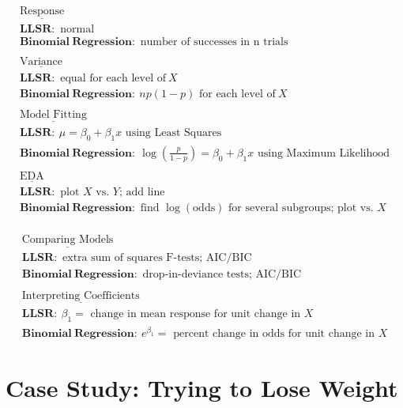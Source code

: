 \documentclass[
]{krantz}
\begin{document}
\begin{gather*}
\underline{\textrm{Response}} \\
\mathbf{LLSR:}\textrm{ normal} \\
\mathbf{Binomial\ Regression:}\textrm{ number of successes in n trials} \\
\textrm{ } \\
\underline{\textrm{Variance}} \\
\mathbf{LLSR:}\textrm{ equal for each level of}\ X \\
\mathbf{Binomial\ Regression:}\ np(1-p)\textrm{ for each level of}\ X \\
\textrm{ } \\
\underline{\textrm{Model Fitting}} \\
\mathbf{LLSR:}\ \mu=\beta_0+\beta_1x \textrm{ using Least Squares}\\
\mathbf{Binomial\ Regression:}\ \log\left(\frac{p}{1-p}\right)=\beta_0+\beta_1x \textrm{ using Maximum Likelihood}\\
\textrm{ } \\
\underline{\textrm{EDA}} \\
\mathbf{LLSR:}\textrm{ plot $X$ vs. $Y$; add line} \\
\mathbf{Binomial\ Regression:}\textrm{ find $\log(\textrm{odds})$ for several subgroups; plot vs. $X$} \\
\end{gather*}

\begin{gather*}
\underline{\textrm{Comparing Models}} \\
\mathbf{LLSR:}\textrm{ extra sum of squares F-tests; AIC/BIC} \\
\mathbf{Binomial\ Regression:}\textrm{ drop-in-deviance tests; AIC/BIC} \\
\textrm{ } \\
\underline{\textrm{Interpreting Coefficients}} \\
\mathbf{LLSR:}\ \beta_1=\textrm{ change in mean response for unit change in $X$} \\
\mathbf{Binomial\ Regression:}\ e^{\beta_1}=\textrm{ percent change in odds for unit change in $X$} 
\end{gather*}

\section{Case Study: Trying to Lose Weight}\label{case-study-trying-to-lose-weight}
\end{document}
